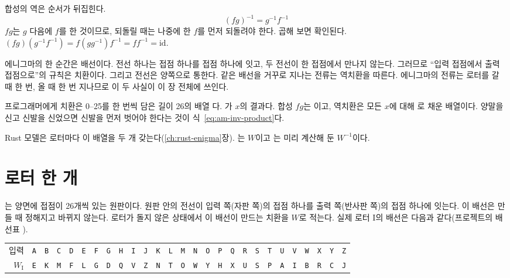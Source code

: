 합성의 역은 순서가 뒤집힌다.
\begin{equation}
  (fg)^{-1} = g^{-1} f^{-1} \label{eq:am-inv-product}
\end{equation}
$fg$는 $g$ 다음에 $f$를 한 것이므로, 되돌릴 때는 나중에 한 $f$를 먼저 되돌려야 한다. 곱해 보면 확인된다.
$(fg)(g^{-1}f^{-1}) = f(gg^{-1})f^{-1} = ff^{-1} = \mathrm{id}$.

\Why 에니그마의 한 순간은 배선이다. 전선 하나는 접점 하나를 접점 하나에 잇고, 두 전선이 한 접점에서 만나지
않는다. 그러므로 ``입력 접점에서 출력 접점으로''의 규칙은 치환이다. 그리고 전선은 양쪽으로 통한다. 같은 배선을
거꾸로 지나는 전류는 역치환을 따른다. 에니그마의 전류는 로터를 갈 때 한 번, 올 때 한 번 지나므로 이 두 사실이
이 장 전체에 쓰인다.

\General 프로그래머에게 치환은 0--25를 한 번씩 담은 길이 26의 배열 다. 가 $x$의 결과다.
합성 $fg$는 이고, 역치환은 모든 $x$에 대해 로 채운 배열이다. 양말을 신고 신발을
신었으면 신발을 먼저 벗어야 한다는 것이 식~\eqref{eq:am-inv-product}다.

{\setlength{\emergencystretch}{2em}%
\Ours Rust 모델은 로터마다 이 배열을 두 개 갖는다(\ref{ch:rust-enigma}장). 는 $W$이고
는 미리 계산해 둔 $W^{-1}$이다.\par}

\section{로터 한 개}\label{sec:am-rotor}

는 양면에 접점이 26개씩 있는 원판이다. 원판 안의 전선이 입력 쪽(자판 쪽)의 접점 하나를 출력
쪽(반사판 쪽)의 접점 하나에 잇는다. 이 배선은 만들 때 정해지고 바뀌지 않는다. 로터가 돌지 않은 상태에서 이 배선이
만드는 치환을 $W$로 적는다. 실제 로터 I의 배선은 다음과 같다(프로젝트의 배선표 ).

\begin{center}
\small\setlength{\tabcolsep}{1.7pt}
\begin{tabular}{r*{26}{c}}
\textrm{입력} & \texttt{A}&\texttt{B}&\texttt{C}&\texttt{D}&\texttt{E}&\texttt{F}&\texttt{G}&\texttt{H}&\texttt{I}&\texttt{J}&\texttt{K}&\texttt{L}&\texttt{M}&\texttt{N}&\texttt{O}&\texttt{P}&\texttt{Q}&\texttt{R}&\texttt{S}&\texttt{T}&\texttt{U}&\texttt{V}&\texttt{W}&\texttt{X}&\texttt{Y}&\texttt{Z} \\
$W_{\mathrm{I}}$ & \texttt{E}&\texttt{K}&\texttt{M}&\texttt{F}&\texttt{L}&\texttt{G}&\texttt{D}&\texttt{Q}&\texttt{V}&\texttt{Z}&\texttt{N}&\texttt{T}&\texttt{O}&\texttt{W}&\texttt{Y}&\texttt{H}&\texttt{X}&\texttt{U}&\texttt{S}&\texttt{P}&\texttt{A}&\texttt{I}&\texttt{B}&\texttt{R}&\texttt{C}&\texttt{J} \\
\end{tabular}
\end{center}

